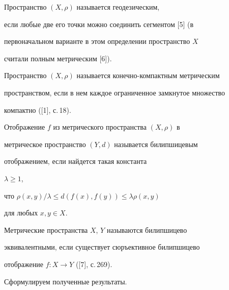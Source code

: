 Пространство $(X,\rho)$ называется геодезическим,


если любые две его точки можно соединить сегментом [5] (в


первоначальном варианте в этом определении пространство $X$


считали полным метрическим [6]).





Пространство $(X,\rho)$ называется конечно-компактным метрическим


пространством, если в нем каждое ограниченное замкнутое множество


компактно ([1], с.\,18).





Отображение $f$ из метрического пространства $(X,\rho)$ в


метрическое пространство $(Y,d)$ называется билипшицевым


отображением, если найдется такая константа


$\lambda \geq 1$,


что $\rho(x,y)/\lambda \leq d(f(x),f(y)) \leq \lambda\rho(x,y)$


для любых $x,y \in X$.


Метрические пространства $X$, $Y$ называются билипшицево


эквивалентными, если существует сюръективное билипшицево


отображение $f : X \rightarrow Y$ ([7], с.\,269).





Сформулируем полученные результаты.








